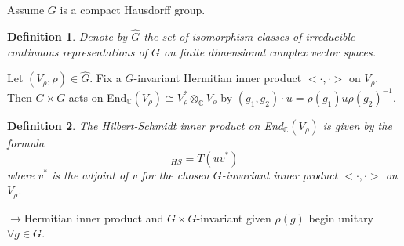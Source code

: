 \documentclass[12pt,letterpaper]{report}
\newtheorem{definition}{Definition}[section]
\begin{document}
\\\\\indent Assume $G$ is a compact Hausdorff group.
\begin{definition}Denote by $\hat{G}$ the set of isomorphism classes of irreducible continuous representations of $G$ on finite dimensional complex vector spaces.\end{definition}
Let $(V_{\rho},\rho)\in\hat{G}$. Fix a $G$-invariant Hermitian inner product $<\cdot,\cdot>$ on $V_{\rho}$. Then $G\times G$ acts on End$_{\mathbb{C}}(V_{\rho})\cong V_{\rho}^{*}\otimes_{\mathbb{C}}V_{\rho}$ by $(g_{1},g_{2})\cdot u=\rho(g_{1})u\rho(g_{2})^{-1}$. 
\begin{definition}The Hilbert-Schmidt inner product on End$_{\mathbb{C}}(V_{\rho})$ is given by the formula \begin{equation*}<u,v>_{HS}=T(uv^{*})\end{equation*} where $v^{*}$ is the adjoint of $v$ for the chosen $G$-invariant inner product $<\cdot, \cdot>$ on $V_{\rho}$.\end{definition}
$\rightarrow $Hermitian inner product and $G\times G$-invariant given $\rho(g)$ begin unitary $\forall g\in G$.
\end{document}
